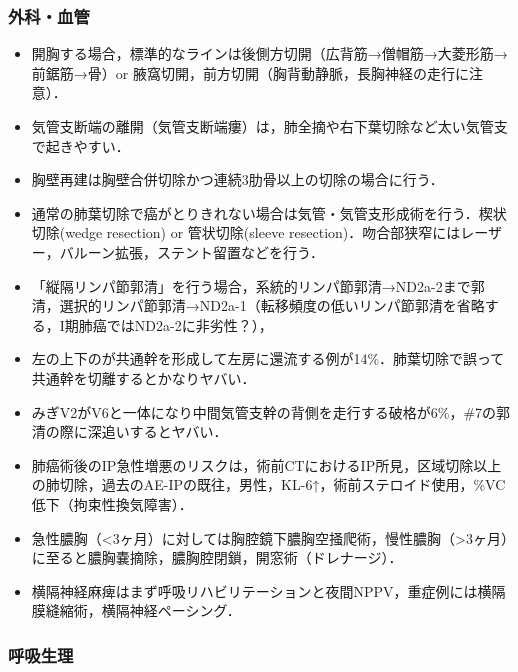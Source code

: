\begin{itemize}

\end{itemize}


\subsubsection{外科・血管}

\begin{itemize}
\item 開胸する場合，標準的なラインは後側方切開（広背筋→僧帽筋→大菱形筋→前鋸筋→骨）or 腋窩切開，前方切開（胸背動静脈，長胸神経の走行に注意）．
\item 気管支断端の離開（気管支断端瘻）は，肺全摘や右下葉切除など太い気管支で起きやすい．
\item 胸壁再建は胸壁合併切除かつ連続3肋骨以上の切除の場合に行う．
\item 通常の肺葉切除で癌がとりきれない場合は気管・気管支形成術を行う．楔状切除(wedge resection) or 管状切除(sleeve resection)．吻合部狭窄にはレーザー，バルーン拡張，ステント留置などを行う．
\item 「縦隔リンパ節郭清」を行う場合，系統的リンパ節郭清→ND2a-2まで郭清，選択的リンパ節郭清→ND2a-1（転移頻度の低いリンパ節郭清を省略する，I期肺癌ではND2a-2に非劣性？），
\item 左の上下のが共通幹を形成して左房に還流する例が14\%．肺葉切除で誤って共通幹を切離するとかなりヤバい．
\item みぎV2がV6と一体になり中間気管支幹の背側を走行する破格が6\%，\#7の郭清の際に深追いするとヤバい．
\item 肺癌術後のIP急性増悪のリスクは，術前CTにおけるIP所見，区域切除以上の肺切除，過去のAE-IPの既往，男性，KL-6↑，術前ステロイド使用，\%VC低下（拘束性換気障害）．
\item 急性膿胸（<3ヶ月）に対しては胸腔鏡下膿胸空掻爬術，慢性膿胸（>3ヶ月）に至ると膿胸嚢摘除，膿胸腔閉鎖，開窓術（ドレナージ）．
\item 横隔神経麻痺はまず呼吸リハビリテーションと夜間NPPV，重症例には横隔膜縫縮術，横隔神経ペーシング．
\end{itemize}


\subsubsection{呼吸生理}

